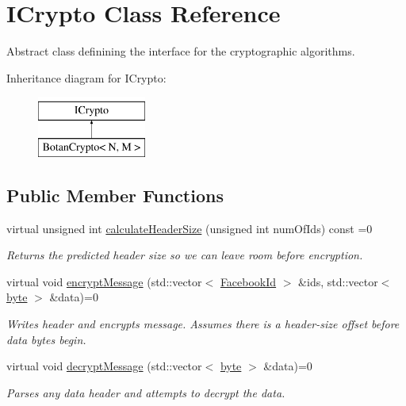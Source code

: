 \hypertarget{classefb_1_1ICrypto}{
\section{ICrypto Class Reference}
\label{classefb_1_1ICrypto}
}


Abstract class definining the interface for the cryptographic algorithms.  


Inheritance diagram for ICrypto:\begin{figure}[H]
\begin{center}
\leavevmode
\includegraphics[height=2.000000cm]{classefb_1_1ICrypto}
\end{center}
\end{figure}
\subsection*{Public Member Functions}
\begin{DoxyCompactItemize}
\item 
virtual unsigned int \hyperlink{classefb_1_1ICrypto_a1d1ef41942f8d5c114ffd8180fbe547f}{calculateHeaderSize} (unsigned int numOfIds) const =0
\begin{DoxyCompactList}\small\item\em Returns the predicted header size so we can leave room before encryption. \item\end{DoxyCompactList}\item 
virtual void \hyperlink{classefb_1_1ICrypto_a258cb59b2942fbac3615b14207dbdf78}{encryptMessage} (std::vector$<$ \hyperlink{structefb_1_1FacebookId}{FacebookId} $>$ \&ids, std::vector$<$ \hyperlink{namespaceefb_a0c8186d9b9b7880309c27230bbb5e69d}{byte} $>$ \&data)=0
\begin{DoxyCompactList}\small\item\em Writes header and encrypts message. Assumes there is a header-\/size offset before data bytes begin. \item\end{DoxyCompactList}\item 
virtual void \hyperlink{classefb_1_1ICrypto_ac7d12b1021fd2f4bef93aac3169a35db}{decryptMessage} (std::vector$<$ \hyperlink{namespaceefb_a0c8186d9b9b7880309c27230bbb5e69d}{byte} $>$ \&data)=0
\begin{DoxyCompactList}\small\item\em Parses any data header and attempts to decrypt the data. \item\end{DoxyCompactList}\end{DoxyCompactItemize}


